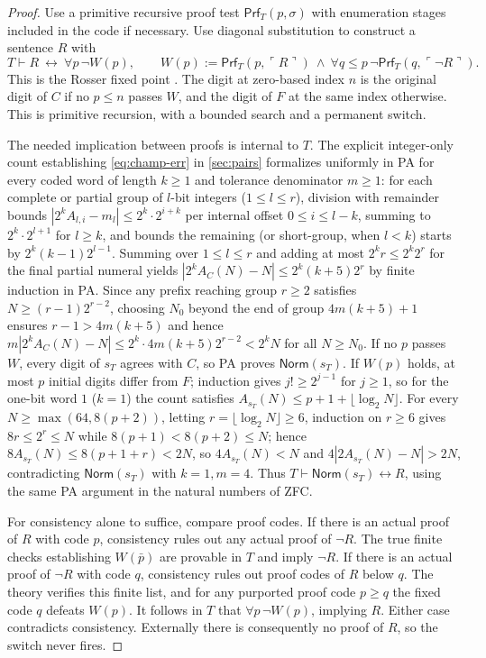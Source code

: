 \documentclass[11pt]{article}
\begin{document}
\begin{proof}
Use a primitive recursive proof test \(\mathsf{Prf}_T(p,\sigma)\) with enumeration stages included in the code if necessary. Use diagonal substitution to construct a sentence \(R\) with
\[
 T\vdash R\ \longleftrightarrow\ \forall p\,\neg W(p),
 \qquad W(p):=\mathsf{Prf}_T(p,\ulcorner R\urcorner)
       \ \land\ \forall q\le p\,\neg\mathsf{Prf}_T(q,\ulcorner\neg R\urcorner).
\]
This is the Rosser fixed point \cite[Theorem~II]{rosser}. The digit at zero-based index \(n\) is the original digit of \(C\) if no \(p\le n\) passes \(W\), and the digit of \(F\) at the same index otherwise. This is primitive recursion, with a bounded search and a permanent switch.

The needed implication between proofs is internal to \(T\). The explicit integer-only count establishing \eqref{eq:champ-err} in \cref{sec:pairs} formalizes uniformly in PA for every coded word of length \(k\ge1\) and tolerance denominator \(m\ge1\): for each complete or partial group of \(l\)-bit integers (\(1\le l\le r\)), division with remainder bounds \(|2^k A_{l,i}-m_l|\le 2^k\cdot 2^{i+k}\) per internal offset \(0\le i\le l-k\), summing to \(2^k\cdot 2^{l+1}\) for \(l\ge k\), and bounds the remaining (or short-group, when \(l<k\)) starts by \(2^k(k-1)2^{l-1}\). Summing over \(1\le l\le r\) and adding at most \(2^k r\le 2^k 2^r\) for the final partial numeral yields \(|2^k A_C(N)-N|\le 2^k(k+5)2^r\) by finite induction in PA. Since any prefix reaching group \(r\ge2\) satisfies \(N\ge(r-1)2^{r-2}\), choosing \(N_0\) beyond the end of group \(4m(k+5)+1\) ensures \(r-1>4m(k+5)\) and hence \(m|2^k A_C(N)-N|\le 2^k\cdot 4m(k+5)2^{r-2}<2^k N\) for all \(N\ge N_0\). If no \(p\) passes \(W\), every digit of \(s_T\) agrees with \(C\), so PA proves \(\mathsf{Norm}(s_T)\). If \(W(p)\) holds, at most \(p\) initial digits differ from \(F\); induction gives \(j!\ge 2^{j-1}\) for \(j\ge1\), so for the one-bit word \(1\) (\(k=1\)) the count satisfies \(A_{s_T}(N)\le p+1+\lfloor\log_2 N\rfloor\). For every \(N\ge\max(64,8(p+2))\), letting \(r=\lfloor\log_2 N\rfloor\ge6\), induction on \(r\ge6\) gives \(8r\le 2^r\le N\) while \(8(p+1)<8(p+2)\le N\); hence \(8 A_{s_T}(N)\le 8(p+1+r)<2N\), so \(4 A_{s_T}(N)<N\) and \(4|2A_{s_T}(N)-N|>2N\), contradicting \(\mathsf{Norm}(s_T)\) with \(k=1,m=4\). Thus \(T\vdash\mathsf{Norm}(s_T)\leftrightarrow R\), using the same PA argument in the natural numbers of ZFC.

For consistency alone to suffice, compare proof codes. If there is an actual proof of \(R\) with code \(p\), consistency rules out any actual proof of \(\neg R\). The true finite checks establishing \(W(\bar p)\) are provable in \(T\) and imply \(\neg R\). If there is an actual proof of \(\neg R\) with code \(q\), consistency rules out proof codes of \(R\) below \(q\). The theory verifies this finite list, and for any purported proof code \(p\ge q\) the fixed code \(q\) defeats \(W(p)\). It follows in \(T\) that \(\forall p\,\neg W(p)\), implying \(R\). Either case contradicts consistency. Externally there is consequently no proof of \(R\), so the switch never fires.
\end{proof}
\end{document}
